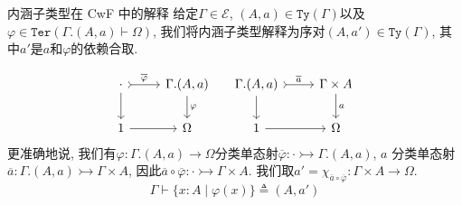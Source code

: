 \documentclass[aspectratio=169,xcolor=dvipsnames]{beamer}
\newcommand\calE{\mathcal{E}}
\newcommand\Ty{\mathtt{Ty}}
\newcommand\Ter{\mathtt{Ter}}
\begin{document}
\begin{frame}{内涵子类型在 CwF 中的解释}
  给定$\Gamma\in\calE$, $(A,a)\in\Ty(\Gamma)$以及$\varphi\in\Ter(\Gamma.(A,a)\vdash\Omega)$, 我们将内涵子类型解释为序对$(A,a')\in\Ty(\Gamma)$, 其中$a'$是$a$和$\varphi$的依赖合取.

  \[
  \begin{tabular}{cc}
  \begin{tikzcd}
    \cdot \arrow[r,tail,"\overline{\varphi}"] \arrow[d] & \Gamma.(A,a) \arrow[d,"{\varphi}"] \\
    1 \arrow[r] & \Omega
  \end{tikzcd}
  &
  \begin{tikzcd}
    \Gamma.(A,a) \arrow[r,tail,"\overline{a}"] \arrow[d] & \Gamma\times A \arrow[d,"a"] \\
    1 \arrow[r] & \Omega
  \end{tikzcd}
\end{tabular}
\]
更准确地说, 我们有$\varphi:\Gamma.(A,a)\to\Omega$分类单态射$\overline{\varphi}:\cdot\rightarrowtail\Gamma.(A,a)$, $a$ 分类单态射 $\overline{a}:\Gamma.(A,a)\rightarrowtail\Gamma\times A$, 因此$\overline{a}\circ\overline{\varphi}:\cdot\rightarrowtail\Gamma\times A$. 我们取$a'=\chi_{\overline{a}\circ\overline{\varphi}}:\Gamma\times A\to\Omega$.
\[
\Gamma\vdash\{x:A\mid\varphi(x)\} \triangleq (A,a')
\]
\end{frame}
\end{document}
